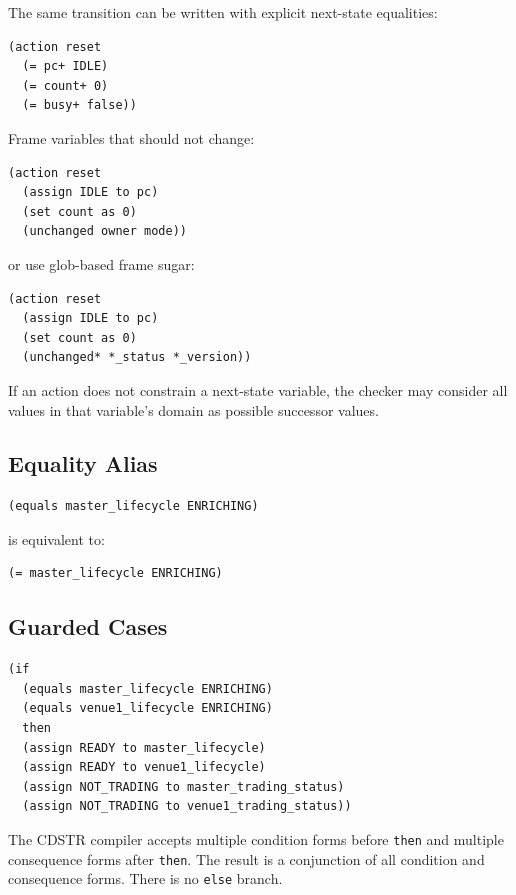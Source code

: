 \documentclass[11pt]{article}
\begin{document}
The same transition can be written with explicit next-state equalities:

\begin{lstlisting}[language=CDSTR]
(action reset
  (= pc+ IDLE)
  (= count+ 0)
  (= busy+ false))
\end{lstlisting}

Frame variables that should not change:

\begin{lstlisting}[language=CDSTR]
(action reset
  (assign IDLE to pc)
  (set count as 0)
  (unchanged owner mode))
\end{lstlisting}

or use glob-based frame sugar:

\begin{lstlisting}[language=CDSTR]
(action reset
  (assign IDLE to pc)
  (set count as 0)
  (unchanged* *_status *_version))
\end{lstlisting}

If an action does not constrain a next-state variable, the checker may consider
all values in that variable's domain as possible successor values.

\subsection{Equality Alias}

\begin{lstlisting}[language=CDSTR]
(equals master_lifecycle ENRICHING)
\end{lstlisting}

is equivalent to:

\begin{lstlisting}[language=CDSTR]
(= master_lifecycle ENRICHING)
\end{lstlisting}

\subsection{Guarded Cases}

\begin{lstlisting}[language=CDSTR]
(if
  (equals master_lifecycle ENRICHING)
  (equals venue1_lifecycle ENRICHING)
  then
  (assign READY to master_lifecycle)
  (assign READY to venue1_lifecycle)
  (assign NOT_TRADING to master_trading_status)
  (assign NOT_TRADING to venue1_trading_status))
\end{lstlisting}

The CDSTR compiler accepts multiple condition forms before \texttt{then} and
multiple consequence forms after \texttt{then}.  The result is a conjunction of
all condition and consequence forms.  There is no \texttt{else} branch.
\end{document}
